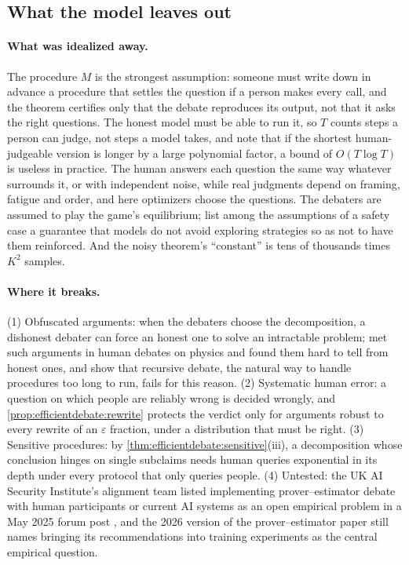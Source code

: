 \begin{refsection}
\section{What the model leaves out}\label{sec:efficientdebate:leavesout}

\paragraph{What was idealized away.} The procedure $M$ is the strongest assumption: someone must write down in advance a procedure that settles the question if a person makes every call, and the theorem certifies only that the debate reproduces its output, not that it asks the right questions. The honest model must be able to run it, so $T$ counts steps a person can judge, not steps a model takes, and \textcite{BrownCohenIrving2024} note that if the shortest human-judgeable version is longer by a large polynomial factor, a bound of $O(T\log T)$ is useless in practice. The human answers each question the same way whatever surrounds it, or with independent noise, while real judgments depend on framing, fatigue and order, and here optimizers choose the questions. The debaters are assumed to play the game's equilibrium; \textcite{BuhlEtAl2025} list among the assumptions of a safety case a guarantee that models do not avoid exploring strategies so as not to have them reinforced. And the noisy theorem's ``constant'' is tens of thousands times $K^2$ samples.

\paragraph{Where it breaks.} (1) Obfuscated arguments: when the debaters choose the decomposition, a dishonest debater can force an honest one to solve an intractable problem; \textcite{Barnes2020} met such arguments in human debates on physics and found them hard to tell from honest ones, and \textcite{BrownCohenIrving2024} show that recursive debate, the natural way to handle procedures too long to run, fails for this reason. (2) Systematic human error: a question on which people are reliably wrong is decided wrongly, and \cref{prop:efficientdebate:rewrite} protects the verdict only for arguments robust to every rewrite of an $\varepsilon$ fraction, under a distribution that must be right. (3) Sensitive procedures: by \cref{thm:efficientdebate:sensitive}(iii), a decomposition whose conclusion hinges on single subclaims needs human queries exponential in its depth under every protocol that only queries people. (4) Untested: the UK AI Security Institute's alignment team listed implementing prover--estimator debate with human participants or current AI systems as an open empirical problem in a May 2025 forum post \parencite{HiltonEtAl2025}, and the 2026 version of the prover--estimator paper still names bringing its recommendations into training experiments as the central empirical question.


\end{refsection}
